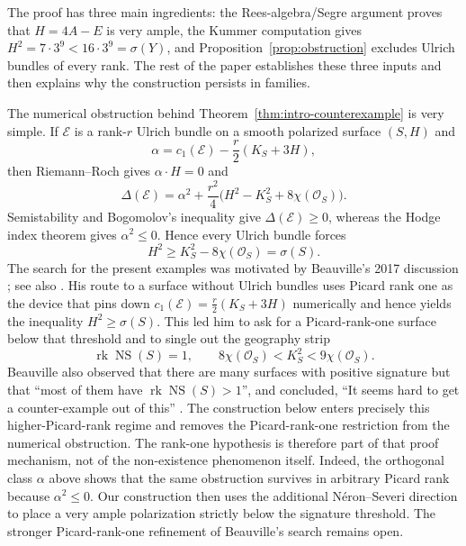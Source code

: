 \documentclass[11pt]{article}
\newcommand{\OO}{\mathcal O}
\newcommand{\cE}{\mathcal E}
\newcommand{\NS}{\operatorname{NS}}
\newcommand{\sig}{\sigma}
\begin{document}
The proof has three main ingredients: the Rees-algebra/Segre argument proves that
$H=4A-E$ is very ample, the Kummer computation gives
$H^2=7\cdot3^9<16\cdot3^9=\sig(Y)$, and Proposition~\ref{prop:obstruction}
excludes Ulrich bundles of every rank.  The rest of the paper establishes these
three inputs and then explains why the construction persists in families.

The numerical obstruction behind Theorem~\ref{thm:intro-counterexample} is very
simple.  If $\cE$ is a rank-$r$ Ulrich bundle on a smooth polarized surface
$(S,H)$ and
\[
        \alpha=c_1(\cE)-\frac r2(K_S+3H),
\]
then Riemann--Roch gives $\alpha\cdot H=0$ and
\[
 \Delta(\cE)=\alpha^2+\frac{r^2}{4}
 \bigl(H^2-K_S^2+8\chi(\OO_S)\bigr).
\]
Semistability and Bogomolov's inequality give $\Delta(\cE)\ge0$, whereas the Hodge index theorem
gives $\alpha^2\le0$.  Hence every Ulrich bundle forces
\begin{equation}\label{eq:intro-obstruction}
        H^2\ge K_S^2-8\chi(\OO_S)=\sig(S).
\end{equation}
The search for the present examples was motivated by Beauville's 2017 discussion
\cite[slides~18--20]{Beauville2017}; see also \cite{Beauville2018}.  His route to
a surface without Ulrich bundles uses Picard rank one as the device that pins down
$c_1(\cE)=\tfrac r2(K_S+3H)$ numerically and hence yields the inequality
$H^2\ge\sig(S)$.  This led him to ask for a Picard-rank-one surface below that
threshold and to single out the geography strip
\[
        \operatorname{rk}\NS(S)=1,\qquad
        8\chi(\OO_S)<K_S^2<9\chi(\OO_S).
\]
Beauville also observed that there are many surfaces with positive signature but that
``most of them have $\operatorname{rk}\NS(S)>1$'', and concluded,
``It seems hard to get a counter-example out of this''
\cite[slides~19--20]{Beauville2017}.  The construction below enters precisely
this higher-Picard-rank regime and removes the Picard-rank-one restriction from
the numerical obstruction.
The rank-one hypothesis is therefore part of that proof mechanism, not of the
non-existence phenomenon itself.  Indeed, the orthogonal class $\alpha$ above shows
that the same obstruction survives in arbitrary Picard rank because
$\alpha^2\le0$.  Our construction then uses the additional N\'eron--Severi direction
to place a very ample polarization strictly below the signature threshold.  The
stronger Picard-rank-one refinement of Beauville's search remains open.
\end{document}
